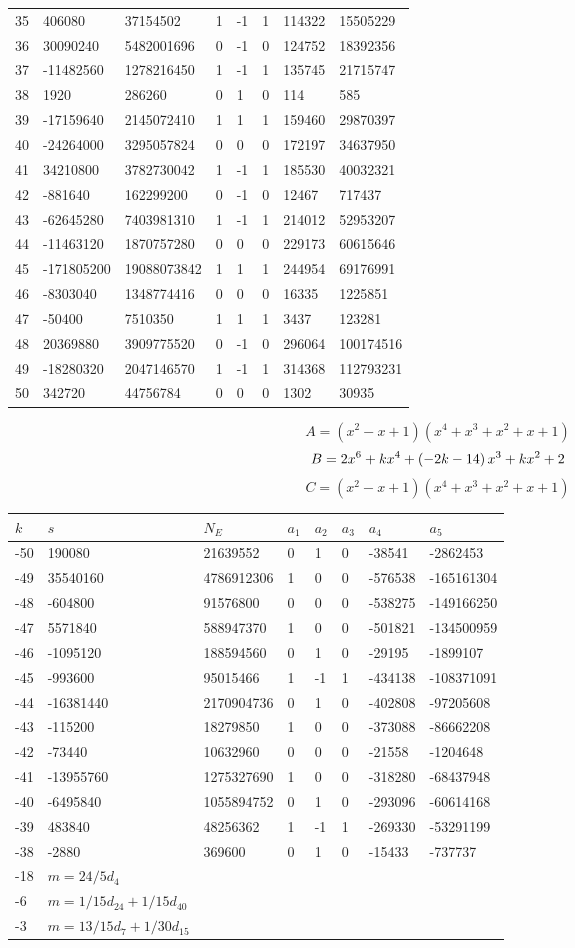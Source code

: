 \documentclass{amsart}
\begin{document}
\begin{longtable}{|l|l|l|lllll|}
35&406080&37154502&1&-1&1&114322&15505229\\
36&30090240&5482001696&0&-1&0&124752&18392356\\
37&-11482560&1278216450&1&-1&1&135745&21715747\\
38&1920&286260&0&1&0&114&585\\
39&-17159640&2145072410&1&1&1&159460&29870397\\
40&-24264000&3295057824&0&0&0&172197&34637950\\
41&34210800&3782730042&1&-1&1&185530&40032321\\
42&-881640&162299200&0&-1&0&12467&717437\\
43&-62645280&7403981310&1&-1&1&214012&52953207\\
44&-11463120&1870757280&0&0&0&229173&60615646\\
45&-171805200&19088073842&1&1&1&244954&69176991\\
46&-8303040&1348774416&0&0&0&16335&1225851\\
47&-50400&7510350&1&1&1&3437&123281\\
48&20369880&3909775520&0&-1&0&296064&100174516\\
49&-18280320&2047146570&1&-1&1&314368&112793231\\
50&342720&44756784&0&0&0&1302&30935\\
\hline
\end{longtable}
$$A=(x^2
 - x
 + 1)(x^4
 + x^3
 + x^2
 + x
 + 1)$$
$$B=2\*x^6
 + k\*x^4
 + \left(-2\*k
 - 14\right) \*x^3
 + k\*x^2
 + 2$$
$$C=(x^2
 - x
 + 1)(x^4
 + x^3
 + x^2
 + x
 + 1)$$
\begin{longtable}{|l|l|l|lllll|}
\hline
$k$ & $s$ & $N_E$ & $a_1$ & $a_2$ & $a_3$ & $a_4$ & $a_5$\\
\hline
-50&190080&21639552&0&1&0&-38541&-2862453\\
-49&35540160&4786912306&1&0&0&-576538&-165161304\\
-48&-604800&91576800&0&0&0&-538275&-149166250\\
-47&5571840&588947370&1&0&0&-501821&-134500959\\
-46&-1095120&188594560&0&1&0&-29195&-1899107\\
-45&-993600&95015466&1&-1&1&-434138&-108371091\\
-44&-16381440&2170904736&0&1&0&-402808&-97205608\\
-43&-115200&18279850&1&0&0&-373088&-86662208\\
-42&-73440&10632960&0&0&0&-21558&-1204648\\
-41&-13955760&1275327690&1&0&0&-318280&-68437948\\
-40&-6495840&1055894752&0&1&0&-293096&-60614168\\
-39&483840&48256362&1&-1&1&-269330&-53291199\\
-38&-2880&369600&0&1&0&-15433&-737737\\
-18&$m=24/5d_{4}$&&\multicolumn{5}{c|}{}\\
-6&$m=1/15d_{24}+1/15d_{40}$&&\multicolumn{5}{c|}{}\\
-3&$m=13/15d_{7}+1/30d_{15}$&&\multicolumn{5}{c|}{}\\
\hline
\end{longtable}
\end{document}
